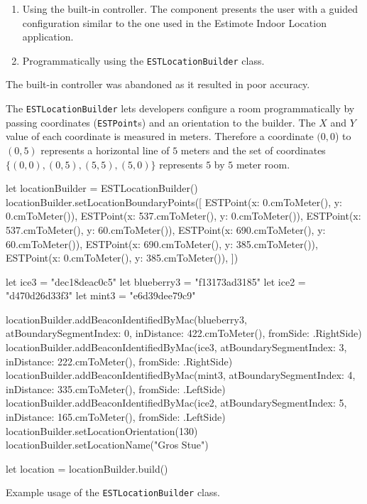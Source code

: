 \begin{enumerate}
\item Using the built-in controller. The component presents the user with a guided configuration similar to the one used in the Estimote Indoor Location application.
\item Programmatically using the \texttt{ESTLocationBuilder} class.
\end{enumerate}

The built-in controller was abandoned as it resulted in poor accuracy.

The \texttt{ESTLocationBuilder} lets developers configure a room programmatically by passing coordinates (\texttt{ESTPoint}s) and an orientation to the builder. 
The $X$ and $Y$ value of each coordinate is measured in meters. 
Therefore a coordinate $(0, 0$) to $(0, 5)$ represents a horizontal line of $5$ meters and the set of coordinates $\{(0,0),(0,5),(5,5),(5,0)\}$ represents $5$ by $5$ meter room.

\begin{listing}
  \begin{swiftcode}
          let locationBuilder = ESTLocationBuilder()
          locationBuilder.setLocationBoundaryPoints([
              ESTPoint(x: 0.cmToMeter(), y: 0.cmToMeter()),
              ESTPoint(x: 537.cmToMeter(), y: 0.cmToMeter()),
              ESTPoint(x: 537.cmToMeter(), y: 60.cmToMeter()),
              ESTPoint(x: 690.cmToMeter(), y: 60.cmToMeter()),
              ESTPoint(x: 690.cmToMeter(), y: 385.cmToMeter()),
              ESTPoint(x: 0.cmToMeter(), y: 385.cmToMeter()),
          ])
          
          let ice3 = "dec18deac0c5"
          let blueberry3 = "f13173ad3185"
          let ice2 = "d470d26d33f3"
          let mint3 = "e6d39dee79c9"
          
          locationBuilder.addBeaconIdentifiedByMac(blueberry3, atBoundarySegmentIndex: 0, inDistance: 422.cmToMeter(), fromSide: .RightSide)
          locationBuilder.addBeaconIdentifiedByMac(ice3, atBoundarySegmentIndex: 3, inDistance: 222.cmToMeter(), fromSide: .RightSide)
          locationBuilder.addBeaconIdentifiedByMac(mint3, atBoundarySegmentIndex: 4, inDistance: 335.cmToMeter(), fromSide: .LeftSide)
          locationBuilder.addBeaconIdentifiedByMac(ice2, atBoundarySegmentIndex: 5, inDistance: 165.cmToMeter(), fromSide: .LeftSide)
          locationBuilder.setLocationOrientation(130)
          locationBuilder.setLocationName("Gros Stue")
          
          let location = locationBuilder.build()
  \end{swiftcode}
  \caption{Example usage of the \texttt{ESTLocationBuilder} class.}
  \label{lst:estlocationbuilder}
\end{listing}

